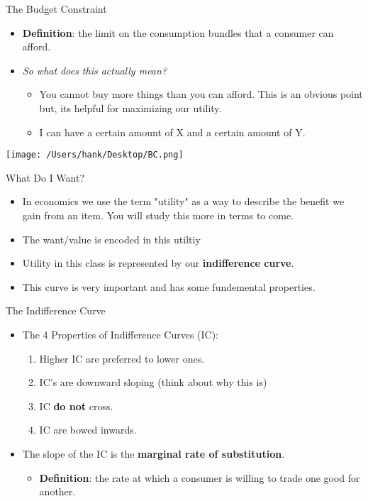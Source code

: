 \documentclass[aspectratio=169]{beamer}
\begin{document}
\begin{frame}{The Budget Constraint}
    \begin{itemize}
        \item \textbf{Definition}: the limit on the consumption bundles that a consumer can afford.
        \item \textit{So what does this actually mean?}
        \begin{itemize}
            \item You cannot buy more things than you can afford. This is an obvious point but, its helpful for maximizing our utility.
            \item I can have a certain amount of X and a certain amount of Y.
        \end{itemize}
    \end{itemize}
   
    \begin{center}
        \texttt{[image: /Users/hank/Desktop/BC.png]}
    \end{center}
\end{frame}

\begin{frame}{What Do I Want?}
    \begin{itemize}
        \item In economics we use the term "utility" as a way to describe the benefit we gain from an item. You will study this more in terms to come.
        \item The want/value is encoded in this utiltiy
        \item Utility in this class is represented by our \textbf{indifference curve}.
        \item This curve is very important and has some fundemental properties.
    \end{itemize}
\end{frame}

\begin{frame}{The Indifference Curve}
    \begin{itemize}
        \item<1-> The 4 Properties of Indifference Curves (IC):
        \begin{enumerate}
            \item<2-> Higher IC are preferred to lower ones.
            \item<3-> IC's are downward sloping (think about why this is)
            \item<4-> IC \textbf{do not} cross.
            \item<5-> IC are bowed inwards. 
        \end{enumerate}
    \item<6-> The slope of the IC is the \textbf{marginal rate of substitution}.
    \begin{itemize}
        \item \textbf{Definition}: the rate at which a consumer is willing to trade one good for another.
    \end{itemize}
    \end{itemize}
\end{frame}
\end{document}
